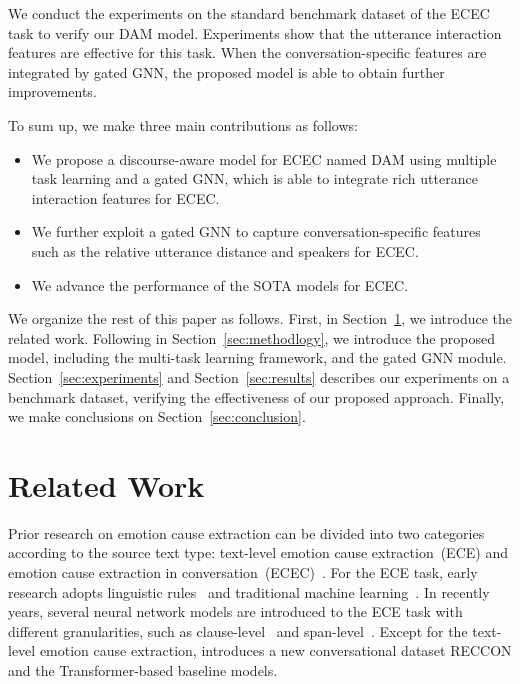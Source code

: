 \documentclass[11pt]{article}
\begin{document}
We conduct the experiments on the standard benchmark dataset of the ECEC task to verify our DAM model.
Experiments show that the utterance interaction features are effective for this task.
When the conversation-specific features are integrated by gated GNN,
the proposed model is able to obtain further improvements.

To sum up, we make three main contributions as follows:
\begin{itemize}
\item[] We propose a discourse-aware model for ECEC named DAM using multiple task learning and a gated GNN,
which is able to integrate rich utterance interaction features for ECEC.
\item[] We further exploit a gated GNN to capture conversation-specific features such as the relative utterance distance and speakers for ECEC.
\item[] We advance the performance of the SOTA models for ECEC.
\end{itemize}

We organize the rest of this paper as follows.
First, in Section~\ref{sec:related work}, we introduce the related work.
Following in Section~\ref{sec:methodlogy}, we introduce the proposed model, including the multi-task learning framework, and the gated GNN module.
Section~\ref{sec:experiments} and Section~\ref{sec:results} describes our experiments on a benchmark dataset, verifying the effectiveness of our proposed approach.
Finally, we make conclusions on Section~\ref{sec:conclusion}.

\section{Related Work}\label{sec:related work}
Prior research on emotion cause extraction can be divided into two categories according to the source text type: text-level emotion cause extraction~(ECE) and emotion cause extraction in conversation~(ECEC)~\cite{poria2021recognizing}.
For the ECE task, early research adopts linguistic rules~\cite{lee2010text,chen2010emotion,russo2011emocause} and traditional machine learning~\cite{gui2014emotion,gui2016emotion,gui2018event,xuEnsembleApproachEmotion2017}.
In recently years, several neural network models are introduced to the ECE task with different granularities, such as clause-level~\cite{diaoMultigranularityBidirectionalAttention2020,dingExperimentalStudyEffects2020,huBidirectionalHierarchicalAttention2021} and span-level~\cite{liBoundaryDetectionBERT2021a,liSpanLevelEmotionCause2021a,qianMultiTaskMRCFramework2021,turcanMultiTaskLearningAdapted2021a,liSpanlevelEmotionCause2021}.
Except for the text-level emotion cause extraction, \citet{poria2021recognizing} introduces a new conversational dataset RECCON and the Transformer-based baseline models. 
\end{document}
